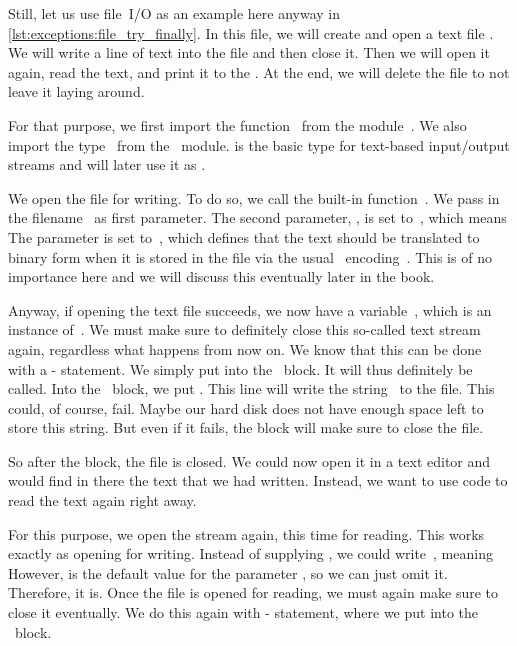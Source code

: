Still, let us use file~I/O as an example here anyway in \cref{lst:exceptions:file_try_finally}.
In this file, we will create and open a text file .
We will write a line of text into the file and then close it.
Then we will open it again, read the text, and print it to the .
At the end, we will delete the file to not leave it laying around.

For that purpose, we first import the function~ from the module~.
We also import the type~ from the ~module.
 is the basic type for text-based input/output streams and will later use it as .

We open the file  for writing.
To do so, we call the built-in function~.
We pass in the filename~ as first parameter.
The second parameter, , is set to~, which means 
The parameter  is set to~, which defines that the text should be translated to binary form when it is stored in the file via the usual ~encoding~\cite{Y2003UATFOI1,ISOIEC106462020ITUCCSU}.
This is of no importance here and we will discuss this eventually later in the book.

Anyway, if opening the text file succeeds, we now have a variable~, which is an instance of~.
We must make sure to definitely close this so-called text stream again, regardless what happens from now on.
We know that this can be done with a - statement.
We simply put  into the ~block.
It will thus definitely be called.
Into the ~block, we put .
This line will write the string~ to the file.
This could, of course, fail.
Maybe our hard disk does not have enough space left to store this string.
But even if it fails, the  block will make sure to close the file.

So after the block, the file is closed.
We could now open it in a text editor and would find in there the text that we had written.
Instead, we want to use code to read the text again right away.

For this purpose, we open the stream again, this time for reading.
This works exactly as opening for writing.
Instead of supplying , we could write~, meaning 
However,  is the default value for the parameter , so we can just omit it.
Therefore,  it is.
Once the file is opened for reading, we must again make sure to close it eventually.
We do this again with - statement, where we put  into the ~block.

